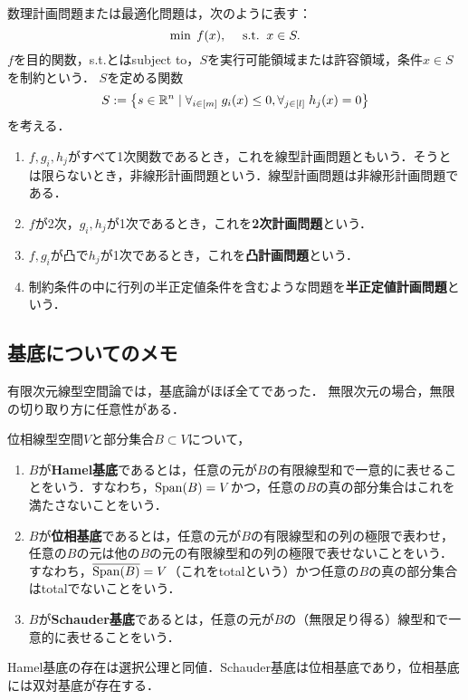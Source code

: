 \documentclass[uplatex,dvipdfmx]{jsreport}
\begin{document}
\begin{definition}
    数理計画問題または最適化問題は，次のように表す：
    \[\min\;f(x),\quad\;\mathrm{s.t.}\;\;x\in S.\]
    $f$を目的関数，s.t.とはsubject to，$S$を実行可能領域または許容領域，条件$x\in S$を制約という．
    $S$を定める関数
    \[S:=\left\{s\in\mathbb{R}^n\mid\forall_{i\in[m]}\;g_i(x)\le0,\forall_{j\in[l]}\;h_j(x)=0\right\}\]
    を考える．
    \begin{enumerate}
        \item $f,g_i,h_j$がすべて1次関数であるとき，これを線型計画問題ともいう．そうとは限らないとき，非線形計画問題という．線型計画問題は非線形計画問題である．
        \item $f$が2次，$g_i,h_j$が1次であるとき，これを\textbf{2次計画問題}という．
        \item $f,g_i$が凸で$h_j$が1次であるとき，これを\textbf{凸計画問題}という．
        \item 制約条件の中に行列の半正定値条件を含むような問題を\textbf{半正定値計画問題}という．
    \end{enumerate}
\end{definition}

\subsection{基底についてのメモ}

\begin{tcolorbox}[colframe=ForestGreen, colback=ForestGreen!10!white,breakable,colbacktitle=ForestGreen!40!white,coltitle=black,fonttitle=\bfseries\sffamily,
title=]
    有限次元線型空間論では，基底論がほぼ全てであった．
    無限次元の場合，無限の切り取り方に任意性がある．
\end{tcolorbox}

\begin{definition}
    位相線型空間$V$と部分集合$B\subset V$について，
    \begin{enumerate}
        \item $B$が\textbf{Hamel基底}であるとは，任意の元が$B$の有限線型和で一意的に表せることをいう．すなわち，$\mathrm{Span}(B)=V$かつ，任意の$B$の真の部分集合はこれを満たさないことをいう．
        \item $B$が\textbf{位相基底}であるとは，任意の元が$B$の有限線型和の列の極限で表わせ，任意の$B$の元は他の$B$の元の有限線型和の列の極限で表せないことをいう．すなわち，$\overline{\mathrm{Span}(B)}=V$（これをtotalという）かつ任意の$B$の真の部分集合はtotalでないことをいう．
        \item $B$が\textbf{Schauder基底}であるとは，任意の元が$B$の（無限足り得る）線型和で一意的に表せることをいう．
    \end{enumerate}
\end{definition}
\begin{remarks}
    Hamel基底の存在は選択公理と同値．Schauder基底は位相基底であり，位相基底には双対基底が存在する．
\end{remarks}
\end{document}
